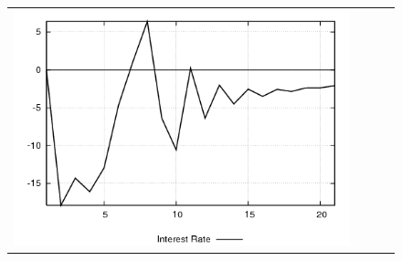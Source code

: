 \begin{figure}
\begin{tabular}{cccc}
\includegraphics[scale=0.22]{results_wlsinit/Interest_Rate_techshock_irf.png} \\ 
\end{tabular}
\end{figure}
